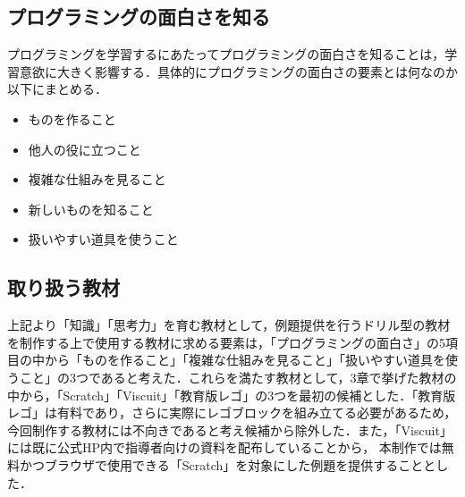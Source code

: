 \subsection{プログラミングの面白さを知る}
プログラミングを学習するにあたってプログラミングの面白さを知ることは，学習意欲に大きく影響する．具体的にプログラミングの面白さの要素とは何なのか以下にまとめる．
\begin{itemize}
\item ものを作ること\\
\item 他人の役に立つこと\\
\item 複雑な仕組みを見ること\\
\item 新しいものを知ること\\
\item 扱いやすい道具を使うこと
\end{itemize}

\subsection{取り扱う教材}
上記より「知識」「思考力」を育む教材として，例題提供を行うドリル型の教材を制作する上で使用する教材に求める要素は，「プログラミングの面白さ」の5項目の中から「ものを作ること」「複雑な仕組みを見ること」「扱いやすい道具を使うこと」の3つであると考えた．これらを満たす教材として，3章で挙げた教材の中から，「Scratch」「Viscuit」「教育版レゴ」の3つを最初の候補とした．「教育版レゴ」は有料であり，さらに実際にレゴブロックを組み立てる必要があるため，今回制作する教材には不向きであると考え候補から除外した．また，「Viscuit」には既に公式HP内で指導者向けの資料を配布していることから， 本制作では無料かつブラウザで使用できる「Scratch」を対象にした例題を提供することとした．